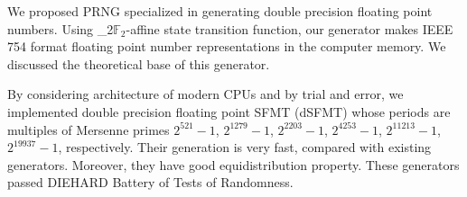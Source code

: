 \documentclass{svmult}
\def\bbf2{\ifmmode\mathbb{F}_2\else$\mathbb{F}_2$\fi}%
\begin{document}
We proposed PRNG specialized in generating double precision
floating point numbers. Using \bbf2-affine state transition
function, our generator makes IEEE 754 format floating point number
representations in the computer
memory. We discussed the theoretical base of this generator.

By considering architecture of modern CPUs and by trial and error, we
implemented double precision floating point SFMT (dSFMT) whose periods
are multiples of 
Mersenne primes $2^{521}-1$, $2^{1279}-1$, $2^{2203}-1$, $2^{4253}-1$, 
$2^{11213}-1$, $2^{19937}-1$, respectively.
Their generation is very fast, compared with existing generators.
Moreover, they have good equidistribution property.
These generators passed DIEHARD Battery of Tests of Randomness\cite{diehard}.


\end{document}
